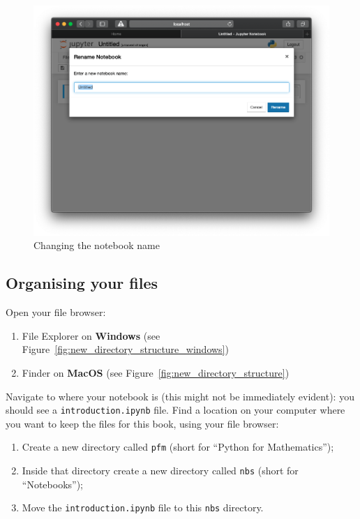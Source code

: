 \begin{figure}[htbp]
\centering
    \includegraphics[width=0.750\linewidth]{assets/changing_notebook_name/main.png}
    \caption{Changing the notebook name}
\end{figure}

\subsection{Organising your files}

Open your file browser:

\begin{enumerate}
    \item File Explorer on \textbf{Windows} (see
        Figure~\ref{fig:new_directory_structure_windows})

\item Finder on \textbf{MacOS} (see
        Figure~\ref{fig:new_directory_structure})
\end{enumerate}

Navigate to where your notebook is (this might not be immediately evident): you
should see a \texttt{introduction.ipynb} file.
Find a location on your computer where you want to keep the files for this
book, using your file browser:

\begin{enumerate}
\item Create a new directory called \texttt{pfm} (short for ``Python for Mathematics'');

\item Inside that directory create a new directory called \texttt{nbs} (short for
``Notebooks'');

\item Move the \texttt{introduction.ipynb} file to this \texttt{nbs} directory.

\end{enumerate}

